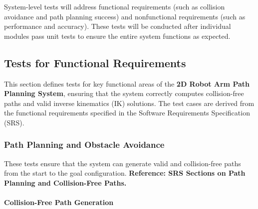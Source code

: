 \documentclass[12pt, titlepage]{article}
\begin{document}
System-level tests will address functional requirements (such as collision avoidance and path planning success) and nonfunctional requirements (such as performance and accuracy). These tests will be conducted after individual modules pass unit tests to ensure the entire system functions as expected.

\subsection{Tests for Functional Requirements}

This section defines tests for key functional areas of the \textbf{2D Robot Arm Path Planning System}, ensuring that the system correctly computes collision-free paths and valid inverse kinematics (IK) solutions. The test cases are derived from the functional requirements specified in the Software Requirements Specification (SRS).

\subsubsection{Path Planning and Obstacle Avoidance}

These tests ensure that the system can generate valid and collision-free paths from the start to the goal configuration. \textbf{Reference: SRS Sections on Path Planning and Collision-Free Paths.}

\paragraph{Collision-Free Path Generation}
\end{document}
